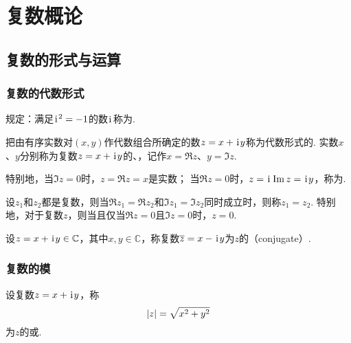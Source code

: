 \chapter{复数概论}
\section{复数的形式与运算}
\subsection{复数的代数形式}
\begin{definition}[虚数单位]
规定：满足\(\kern1pt\mathrm{i}\kern1pt^2=-1\)的数\(\kern1pt\mathrm{i}\kern1pt\)称为.
\end{definition}

\begin{definition}
把由有序实数对\((x,y)\)作代数组合所确定的数\(z=x+\kern1pt\mathrm{i}\kern1pt y\)称为代数形式的.
实数\(x\)、\(y\)分别称为复数\(z=x+\kern1pt\mathrm{i}\kern1pt y\)的、，记作\(x=\Re z\)、\(y=\Im z\).

特别地，当\(\Im z=0\)时，\(z=\Re z=x\)是实数；
当\(\Re z=0\)时，\(z=\kern1pt\mathrm{i}\kern1pt\Im z=\kern1pt\mathrm{i}\kern1pt y\)，称为.
\end{definition}

\begin{definition}[代数形式下复数相等条件]
设\(z_1\)和\(z_2\)都是复数，则当\(\Re z_1 = \Re z_2\)和\(\Im z_1 = \Im z_2\)同时成立时，则称\(z_1 = z_2\).
特别地，对于复数\(z\)，则当且仅当\(\Re z=0\)且\(\Im z=0\)时，\(z=0\).
\end{definition}

\begin{definition}[共轭复数]
设\(z=x + \kern1pt\mathrm{i}\kern1pt y \in\mathbb{C}\)，其中\(x,y\in\mathbb{C}\)，称复数\(\overline{z}=x - \kern1pt\mathrm{i}\kern1pt y\)为\(z\)的（conjugate）.
\end{definition}

\subsection{复数的模}
\begin{definition}[复数的模]
设复数\(z = x + \kern1pt\mathrm{i}\kern1pt y\)，称\[
\abs{z} = \sqrt{x^2 + y^2}
\]为\(z\)的或.
\end{definition}


